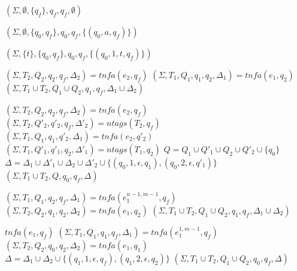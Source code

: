 \documentclass[]{article}
\let\oldnl\nl%
\newcommand{\nonl}{\renewcommand{\nl}{\let\nl\oldnl}}%
\newcommand{\XN}{\mathcal{N}}
\newcommand{\YN}{\mathbb{N}}
\begin{document}
\begin{algorithm}[] \DontPrintSemicolon {}
\begin{multicols}{2}

    \newcommand \retonfa {tn\!f\!a}%
    \newcommand \ntag {ntags}
    \Indm
    \small

    \nonl\Fn {$\underline{\retonfa(e, q_f)} \smallskip$} {

     {
        \Return $(\Sigma, \emptyset, \{q_f\}, q_f, q_f, \emptyset)$
    }
    \BlankLine
    \BlankLine

     {
        \Return $(\Sigma, \emptyset, \{q_0,q_f\}, q_0, q_f, \{(q_0, a, q_f)\})$
    }
    \BlankLine
    \BlankLine

    \ElseIf {$e = t \in \YN$} {
        \Return $(\Sigma, \{t\}, \{q_0, q_f\}, q_0, q_f, \{(q_0, 1, t, q_f)\})$
    }
    \BlankLine
    \BlankLine

     {
        $(\Sigma, T_2, Q_2, q_2, q_f, \Delta_2) = \retonfa (e_2, q_f)$ \;
        $(\Sigma, T_1, Q_1, q_1, q_2, \Delta_1) = \retonfa (e_1, q_2)$ \;
        \Return $(\Sigma, T_1 \cup T_2, Q_1 \cup Q_2, q_1, q_f, \Delta_1 \cup \Delta_2)$
    }
    \BlankLine
    \BlankLine

     {
        $(\Sigma, T_2, Q_2, q_2, q_f, \Delta_2) = \retonfa (e_2, q_f)$ \;
        $(\Sigma, T_2, Q'_2, q'_2, q_f, \Delta'_2) = \ntag (T_2, q_f)$ \;
        $(\Sigma, T_1, Q_1, q_1, q'_2, \Delta_1) = \retonfa (e_2, q'_2)$ \;
        $(\Sigma, T_1, Q'_1, q'_1, q_2, \Delta'_1) = \ntag (T_1, q_2)$ \;
        $Q = Q_1 \cup Q'_1 \cup Q_2 \cup Q'_2 \cup \{q_0\}$ \;
        $\Delta = \Delta_1 \cup \Delta'_1 \cup \Delta_2 \cup \Delta'_2 \cup \{ (q_0,1,\epsilon,q_1), (q_0,2,\epsilon,q'_1) \}$ \;
        \Return $(\Sigma, T_1 \cup T_2, Q, q_0, q_f, \Delta)$
    }
    \BlankLine
    \BlankLine

     {
        $(\Sigma, T_1, Q_1, q_2, q_f, \Delta_1) = \retonfa(e_1^{n\!-\!1, m\!-\!1}, q_f)$ \;
        $(\Sigma, T_2, Q_2, q_1, q_2, \Delta_2) = \retonfa(e_1, q_2)$ \;
        \Return $(\Sigma, T_1 \cup T_2, Q_1 \cup Q_2, q_1, q_f, \Delta_1 \cup \Delta_2)$
    }
    \BlankLine
    \BlankLine

     {
         {
            \Return $\retonfa (e_1, q_f)$
        }
        $(\Sigma, T_1, Q_1, q_1, q_f, \Delta_1) = \retonfa (e_1^{1, m\!-\!1}, q_f)$ \;
        $(\Sigma, T_2, Q_2, q_0, q_2, \Delta_2) = \retonfa (e_1, q_1)$ \;
        $\Delta = \Delta_1 \cup \Delta_2 \cup \{ (q_1, 1, \epsilon, q_f), (q_1, 2, \epsilon, q_2) \}$ \;
        \Return $(\Sigma, T_1 \cup T_2, Q_1 \cup Q_2, q_0, q_f, \Delta)$
    }
    \BlankLine
    \BlankLine

}
\end{multicols}
\end{algorithm}
\end{document}
